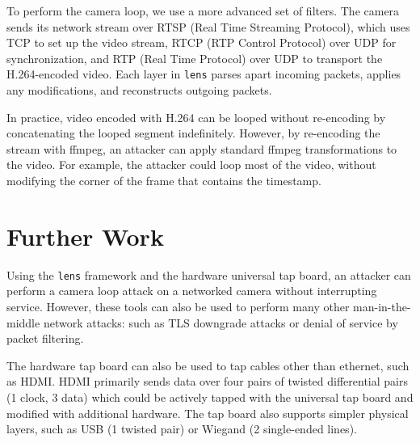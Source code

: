 \documentclass[12pt]{article}
\begin{document}
To perform the camera loop, we use a more advanced set of filters. The camera sends its network stream over RTSP (Real Time Streaming Protocol), which uses TCP to set up the video stream, RTCP (RTP Control Protocol) over UDP for synchronization, and RTP (Real Time Protocol) over UDP to transport the H.264-encoded video. Each layer in \texttt{lens} parses apart incoming packets, applies any modifications, and reconstructs outgoing packets.

	In practice, video encoded with H.264 can be looped without re-encoding by concatenating the looped segment indefinitely. However, by re-encoding the stream with ffmpeg, an attacker can apply standard ffmpeg transformations to the video. For example, the attacker could loop most of the video, without modifying the corner of the frame that contains the timestamp.


\section{Further Work}
Using the \texttt{lens} framework and the hardware universal tap board, an attacker can perform a camera loop attack on a networked camera without interrupting service. However, these tools can also be used to perform many other man-in-the-middle network attacks: such as TLS downgrade attacks or denial of service by packet filtering. 

	The hardware tap board can also be used to tap cables other than ethernet, such as HDMI. HDMI primarily sends data over four pairs of twisted differential pairs (1 clock, 3 data) which could be actively tapped with the universal tap board and modified with additional hardware. The tap board also supports simpler physical layers, such as USB (1 twisted pair) or Wiegand (2 single-ended lines). 
\end{document}
